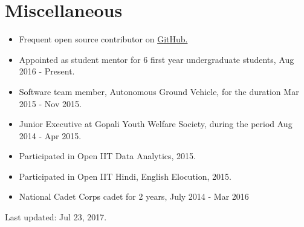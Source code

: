\documentclass[10pt,a4paper]{moderncv}
\newcommand{\newlink}[2]{
  \href{#1}{\color{blue}#2}
}
\begin{document}
\section*{Miscellaneous}
\begin{itemize}
  \setlength\itemsep{0.5em}
  \item Frequent open source contributor on \newlink{https://github.com/kaustubhhiware}{GitHub.}
  \item Appointed as student mentor for 6 first year undergraduate students, Aug 2016 - Present.
  \item Software team member, Autonomous Ground Vehicle, for the duration Mar 2015 - Nov 2015.
  \item Junior Executive at Gopali Youth Welfare Society, during the period Aug 2014 - Apr 2015.
  \item Participated in Open IIT Data Analytics, 2015.
  \item Participated in Open IIT Hindi, English Elocution, 2015.
  \item National Cadet Corps cadet for 2 years, July 2014 - Mar 2016
\end{itemize}

	\vspace*{\fill}
	\begin{flushright}
	\footnotesize Last updated: Jul 23, 2017.
	\end{flushright}
\end{document}
